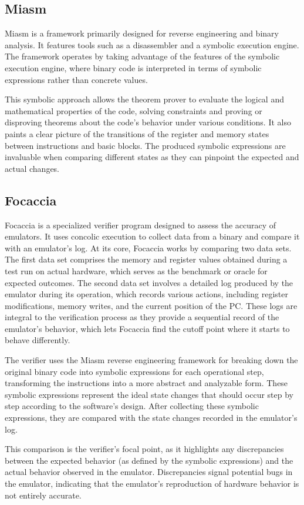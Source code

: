 \subsection{Miasm}
Miasm \cite{desclaux2012miasm} is a framework primarily designed for reverse engineering and binary analysis.
It features tools such as a disassembler and a symbolic execution engine.
The framework operates by taking advantage of the features of the symbolic execution engine, where binary code is interpreted in terms of symbolic expressions rather than concrete values.

This symbolic approach allows the theorem prover to evaluate the logical and mathematical properties of the code, solving constraints and proving or disproving theorems about the code's behavior under various conditions.
It also paints a clear picture of the transitions of the register and memory states between instructions and basic blocks.
The produced symbolic expressions are invaluable when comparing different states as they can pinpoint the expected and actual changes.

\subsection{Focaccia}
Focaccia is a specialized verifier program designed to assess the accuracy of emulators.
It uses concolic execution to collect data from a binary and compare it with an emulator's log.
At its core, Focaccia works by comparing two data sets.
The first data set comprises the memory and register values obtained during a test run on actual hardware, which serves as the benchmark or oracle for expected outcomes. 
The second data set involves a detailed log produced by the emulator during its operation, which records various actions, including register modifications, memory writes, and the current position of the \ac{PC}.
These logs are integral to the verification process as they provide a sequential record of the emulator's behavior, which lets Focaccia find the cutoff point where it starts to behave differently.

The verifier uses the Miasm \cite{desclaux2012miasm} reverse engineering framework for breaking down the original binary code into symbolic expressions for each operational step, transforming the instructions into a more abstract and analyzable form.
These symbolic expressions represent the ideal state changes that should occur step by step according to the software's design.
After collecting these symbolic expressions, they are compared with the state changes recorded in the emulator's log.

This comparison is the verifier's focal point, as it highlights any discrepancies between the expected behavior (as defined by the symbolic expressions) and the actual behavior observed in the emulator.
Discrepancies signal potential bugs in the emulator, indicating that the emulator's reproduction of hardware behavior is not entirely accurate.
